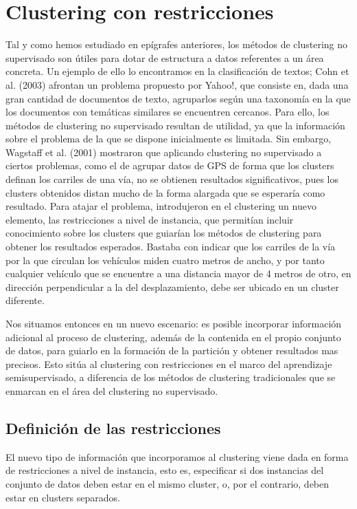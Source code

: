 \chapter{Clustering con restricciones}\label{ch:Clustering con restricciones}

Tal y como hemos estudiado en epígrafes anteriores, los métodos de clustering no supervisado son útiles para dotar de estructura a datos referentes a un área concreta. Un ejemplo de ello lo encontramos en la clasificación de textos; Cohn et al. (2003) afrontan un problema propuesto por Yahoo!, que consiste en, dada una gran cantidad de documentos de texto, agruparlos según una taxonomía en la que los documentos con temáticas similares se encuentren cercanos. Para ello, los métodos de clustering no supervisado resultan de utilidad, ya que la información sobre el problema de la que se dispone inicialmente es limitada. Sin embargo, Wagstaff et al. (2001) mostraron que aplicando clustering no supervisado a ciertos problemas, como el de agrupar datos de GPS de forma que los clusters definan los carriles de una vía, no se obtienen resultados significativos, pues los clusters obtenidos distan mucho de la forma alargada que se esperaría como resultado. Para atajar el problema, introdujeron en el clustering un nuevo elemento, las restricciones a nivel de instancia, que permitían incluir conocimiento sobre los clusters que guiarían los métodos de clustering para obtener los resultados esperados. Bastaba con indicar que los carriles de la vía por la que circulan los vehículos miden cuatro metros de ancho, y por tanto cualquier vehículo que se encuentre a una distancia mayor de 4 metros de otro, en dirección perpendicular a la del desplazamiento, debe ser ubicado en un cluster diferente.

Nos situamos entonces en un nuevo escenario: es posible incorporar información adicional al proceso de clustering, además de la contenida en el propio conjunto de datos, para guiarlo en la formación de la partición y obtener resultados mas precisos. Esto sitúa al clustering con restricciones en el marco del aprendizaje semisupervisado, a diferencia de los métodos de clustering tradicionales que se enmarcan en el área del clustering no supervisado. 

\section{Definición de las restricciones}

El nuevo tipo de  información que incorporamos al clustering viene dada en forma de restricciones a nivel de instancia, esto es, especificar si dos instancias del conjunto de datos deben estar en el mismo cluster, o, por el contrario, deben estar en clusters separados.

